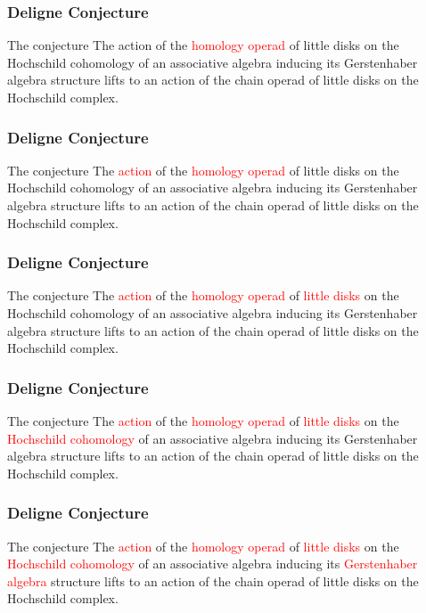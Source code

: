 \documentclass{beamer}
\theoremstyle{definition}
\begin{document}
\begin{frame}
	\frametitle{Deligne Conjecture}
	\begin{block}{The conjecture}
		The action of the \textcolor{red}{homology operad} of little disks on the Hochschild cohomology of an associative algebra inducing its Gerstenhaber algebra structure lifts to an action of the chain operad of little disks on the Hochschild complex.
	\end{block}
\end{frame}
\begin{frame}
	\frametitle{Deligne Conjecture}
	\begin{block}{The conjecture}
		The \textcolor{red}{action} of the \textcolor{red}{homology operad} of little disks on the Hochschild cohomology of an associative algebra inducing its Gerstenhaber algebra structure lifts to an action of the chain operad of little disks on the Hochschild complex.
	\end{block}
\end{frame}
\begin{frame}
		\frametitle{Deligne Conjecture}
	\begin{block}{The conjecture}
	The \textcolor{red}{action} of the \textcolor{red}{homology operad} of \textcolor{red}{little disks} on the Hochschild cohomology of an associative algebra inducing its Gerstenhaber algebra structure lifts to an action of the chain operad of little disks on the Hochschild complex.
\end{block}
\end{frame}

\begin{frame}
	\frametitle{Deligne Conjecture}
	\begin{block}{The conjecture}
		The \textcolor{red}{action} of the \textcolor{red}{homology operad} of \textcolor{red}{little disks} on the \textcolor{red}{Hochschild cohomology} of an associative algebra inducing its Gerstenhaber algebra structure lifts to an action of the chain operad of little disks on the Hochschild complex.
	\end{block}
\end{frame}

\begin{frame}
	\frametitle{Deligne Conjecture}
	\begin{block}{The conjecture}
		The \textcolor{red}{action} of the \textcolor{red}{homology operad} of \textcolor{red}{little disks} on the \textcolor{red}{Hochschild cohomology} of an associative algebra inducing its \textcolor{red}{Gerstenhaber algebra} structure lifts to an action of the chain operad of little disks on the Hochschild complex.
	\end{block}
\end{frame}
\end{document}
